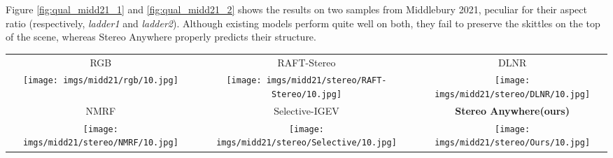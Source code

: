 \documentclass[10pt,twocolumn,letterpaper]{article}
\newcommand{\method}[0]{Stereo Anywhere\xspace}
\begin{document}
\clearpage

Figure \ref{fig:qual_midd21_1} and \ref{fig:qual_midd21_2} shows the results on two samples from Middlebury 2021, peculiar for their aspect ratio (respectively, \textit{ladder1} and \textit{ladder2}). Although existing models perform quite well on both, they fail to preserve the skittles on the top of the scene, whereas \method properly predicts their structure.

\begin{figure*}[h]
    \centering
    \renewcommand{\tabcolsep}{1pt}
    \begin{tabular}{ccc}
        \small RGB &
        \small RAFT-Stereo \cite{lipson2021raft} &
        \small DLNR \cite{zhao2023high} \\
        \texttt{[image: imgs/midd21/rgb/10.jpg]} &
        \texttt{[image: imgs/midd21/stereo/RAFT-Stereo/10.jpg]} &
        \texttt{[image: imgs/midd21/stereo/DLNR/10.jpg]} \\
        \small NMRF \cite{guan2024neural} &
        \small Selective-IGEV \cite{wang2024selective} &
        \textbf{\method (ours)} \\
        \texttt{[image: imgs/midd21/stereo/NMRF/10.jpg]} &
        \texttt{[image: imgs/midd21/stereo/Selective/10.jpg]} &
        \texttt{[image: imgs/midd21/stereo/Ours/10.jpg]} \\
    \end{tabular}

    \caption{\textbf{Qualitative Results -- Middlebury 2021 (part 1).} Predictions by state-of-the-art models and \method.}
    \label{fig:qual_midd21_1}\vspace{-0.3cm}

\end{figure*}

\clearpage
\end{document}
